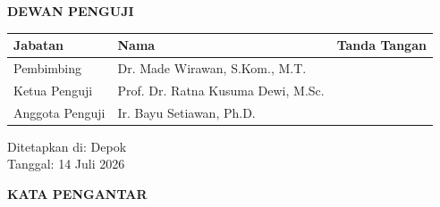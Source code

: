 \documentclass[12pt,a4paper]{report}
\begin{document}
\vspace{0.6cm}
\begin{center}
{\bfseries\color{uinavy}DEWAN PENGUJI}
\end{center}

\begin{center}
\renewcommand{\arraystretch}{2.1}
\begin{tabularx}{\textwidth}{@{}p{3.6cm}X c@{}}
\toprule
\textbf{Jabatan} & \textbf{Nama} & \textbf{Tanda Tangan} \\
\midrule
Pembimbing & Dr. Made Wirawan, S.Kom., M.T. & \underline{\hspace{2.6cm}} \\
Ketua Penguji & Prof. Dr. Ratna Kusuma Dewi, M.Sc. & \underline{\hspace{2.6cm}} \\
Anggota Penguji & Ir. Bayu Setiawan, Ph.D. & \underline{\hspace{2.6cm}} \\
\bottomrule
\end{tabularx}
\end{center}

\vspace{0.8cm}
\begin{center}
Ditetapkan di: Depok \\
Tanggal: 14 Juli 2026
\end{center}

\newpage
\thispagestyle{plain}
\begin{center}
{\bfseries\color{uinavy}\large KATA PENGANTAR}
\end{center}
\vspace{0.6cm}
\end{document}
